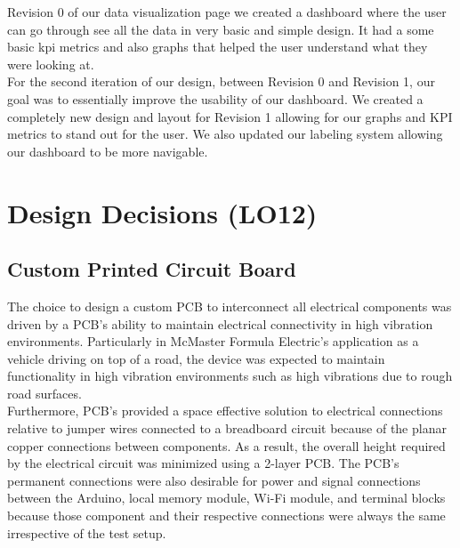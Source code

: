 \documentclass[12pt]{article}
\begin{document}
Revision 0 of our data visualization page we created a dashboard where the user can go through see all the data in very basic and simple design. It had a some basic kpi metrics and also graphs that helped the user understand what they were looking at.\\

For the second iteration of our design, between Revision 0 and Revision 1, our goal was to essentially improve the usability of our dashboard. We created a completely new design and layout for Revision 1 allowing for our graphs and KPI metrics to stand out for the user. We also updated our labeling system allowing our dashboard to be more navigable.\\

\section{Design Decisions (LO12)}


\subsection{Custom Printed Circuit Board}
The choice to design a custom PCB to interconnect all electrical components was driven by a PCB's ability to maintain  electrical connectivity in high vibration environments. Particularly in McMaster Formula Electric's application as a vehicle driving on top of a road, the device was expected to maintain functionality in high vibration environments such as high vibrations due to rough road surfaces. \\

Furthermore, PCB's provided a space effective solution to electrical connections relative to jumper wires connected to a breadboard circuit because of the planar copper connections between components. As a result, the overall height required by the electrical circuit was minimized using a 2-layer PCB. The PCB's permanent connections were also desirable for power and signal connections between the Arduino, local memory module, Wi-Fi module, and terminal blocks because those component and their respective connections were always the same irrespective of the test setup. \\
\end{document}
